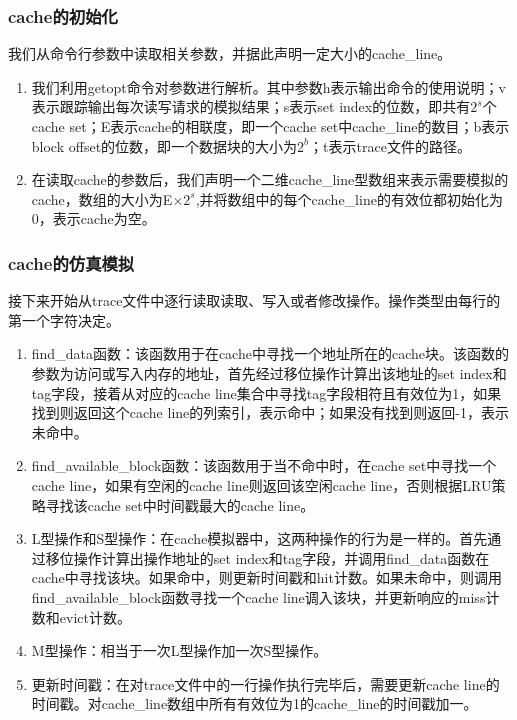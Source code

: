 \documentclass[supercite]{Experimental_Report}
\theoremstyle{definition}
\begin{document}
\subsubsection{cache的初始化}
我们从命令行参数中读取相关参数，并据此声明一定大小的cache\_line。
\begin{enumerate}
  \item 我们利用getopt命令对参数进行解析。其中参数h表示输出命令的使用说明；v表示跟踪输出每次读写请求的模拟结果；s表示set index的位数，即共有$2^s$个cache set；E表示cache的相联度，即一个cache set中cache\_line的数目；b表示block offset的位数，即一个数据块的大小为$2^b$；t表示trace文件的路径。
  \item 在读取cache的参数后，我们声明一个二维cache\_line型数组来表示需要模拟的cache，数组的大小为E$\times$$2^s$,并将数组中的每个cache\_line的有效位都初始化为0，表示cache为空。
\end{enumerate}

\subsubsection{cache的仿真模拟}
接下来开始从trace文件中逐行读取读取、写入或者修改操作。操作类型由每行的第一个字符决定。
\begin{enumerate}
  \item find\_data函数：该函数用于在cache中寻找一个地址所在的cache块。该函数的参数为访问或写入内存的地址，首先经过移位操作计算出该地址的set index和tag字段，接着从对应的cache line集合中寻找tag字段相符且有效位为1，如果找到则返回这个cache line的列索引，表示命中；如果没有找到则返回-1，表示未命中。
  \item find\_available\_block函数：该函数用于当不命中时，在cache set中寻找一个cache line，如果有空闲的cache line则返回该空闲cache line，否则根据LRU策略寻找该cache set中时间戳最大的cache line。
  \item L型操作和S型操作：在cache模拟器中，这两种操作的行为是一样的。首先通过移位操作计算出操作地址的set index和tag字段，并调用find\_data函数在cache中寻找该块。如果命中，则更新时间戳和hit计数。如果未命中，则调用find\_available\_block函数寻找一个cache line调入该块，并更新响应的miss计数和evict计数。
  \item M型操作：相当于一次L型操作加一次S型操作。
  \item 更新时间戳：在对trace文件中的一行操作执行完毕后，需要更新cache line的时间戳。对cache\_line数组中所有有效位为1的cache\_line的时间戳加一。
\end{enumerate}
\end{document}

